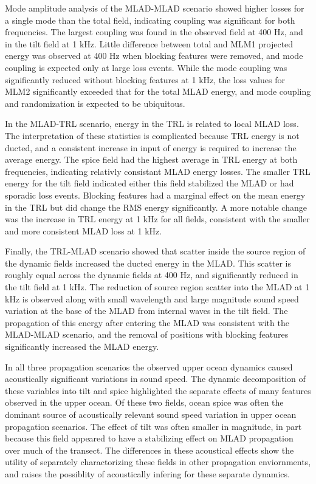 \documentclass[preprint,NumberedRefs]{JASA}
\begin{document}
Mode amplitude analysis of the MLAD-MLAD scenario showed higher losses for a single mode than the total field, indicating coupling was significant for both frequencies. The largest coupling was found in the observed field at 400 Hz, and in the tilt field at 1 kHz. Little difference between total and MLM1 projected energy was observed at 400 Hz when blocking features were removed, and mode coupling is expected only at large loss events. While the mode coupling was significantly reduced without blocking features at 1 kHz, the loss values for MLM2 significantly exceeded that for the total MLAD energy, and mode coupling and randomization is expected to be ubiquitous.

In the MLAD-TRL scenario, energy in the TRL is related to local MLAD loss. The interpretation of these statistics is complicated because TRL energy is not ducted, and a consistent increase in input of energy is required to increase the average energy. The spice field had the highest average in TRL energy at both frequencies, indicating relativly consistant MLAD energy losses. The smaller TRL energy for the tilt field indicated either this field stabilized the MLAD or had sporadic loss events. Blocking features had a marginal effect on the mean energy in the TRL but did change the RMS energy significantly. A more notable change was the increase in TRL energy at 1 kHz for all fields, consistent with the smaller and more consistent MLAD loss at 1 kHz.

Finally, the TRL-MLAD scenario showed that scatter inside the source region of the dynamic fields increased the ducted energy in the MLAD. This scatter is roughly equal across the dynamic fields at 400 Hz, and significantly reduced in the tilt field at 1 kHz. The reduction of source region scatter into the MLAD at 1 kHz is observed along with small wavelength and large magnitude sound speed variation at the base of the MLAD from internal waves in the tilt field. The propagation of this energy after entering the MLAD was consistent with the MLAD-MLAD scenario, and the removal of positions with blocking features significantly increased the MLAD energy.

In all three propagation scenarios the observed upper ocean dynamics caused acoustically significant variations in sound speed. The dynamic decomposition of these variables into tilt and spice highlighted the separate effects of many features observed in the upper ocean. Of these two fields, ocean spice was often the dominant source of acoustically relevant sound speed variation in upper ocean propagation scenarios. The effect of tilt was often smaller in magnitude, in part because this field appeared to have a stabilizing effect on MLAD propagation over much of the transect. The differences in these acoustical effects show the utility of separately charactorizing these fields in other propagation enviornments, and raises the possiblity of acoustically infering for these separate dynamics.



\end{document}
